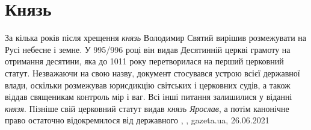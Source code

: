  
 
 
 
 
\chapter{Князь}

За кілька років після хрещення \emph{князь} Володимир Святий вирішив розмежувати на
Русі небесне і земне. У 995/996 році він видав Десятинній церкві грамоту на
отримання десятини, яка до 1011 року перетворилася на перший церковний статут.
Незважаючи на свою назву, документ стосувався устрою всієї державної влади,
оскільки розмежував юрисдикцію світських і церковних судів, а також віддав
священикам контроль мір і ваг. Всі інші питання залишилися у віданні \emph{князя}.
Пізніше свій церковний статут видав \emph{князь Ярослав}, а потім канонічне право
остаточно відокремилося від державного
, 
, gazeta.ua, 26.06.2021

